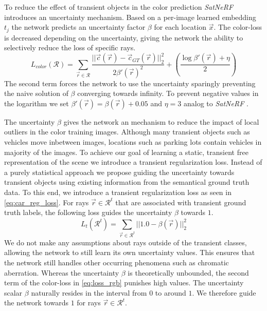 To reduce the effect of transient objects in the color prediction \textit{SatNeRF} \cite{satnerf} introduces an uncertainty mechanism. Based on a per-image learned embedding $t_j$ the network predicts an uncertainty factor $\beta$ for each location $\vec{x}$.
The color-loss is decreased depending on the uncertainty, giving the network the ability to selectively reduce the loss of specific rays. 
\begin{equation}
	L_{color}(\mathcal{R}) = \sum_{\vec{r} \in \mathcal{R}} \frac{|| \vec{c}(\vec{r}) - \vec{c}_{GT}(\vec{r}) ||^2_2}{2\beta'(\vec{r})^2} + \left( \frac{\log{\beta'(\vec{r}) + \eta}}{2} \right)
	\label{eq:loss_rgb}
\end{equation}
The second term forces the network to use the uncertainty sparingly preventing the naive solution of $\beta$ converging towards infinity. To prevent negative values in the logarithm we set $\beta'(\vec{r}) = \beta(\vec{r}) + 0.05$ and $\eta = 3$ analog to \emph{SatNeRF} \cite{satnerf}.


The uncertainty $\beta$ gives the network an mechanism to reduce the impact of local outliers in the color training images. Although many transient objects such as vehicles move inbetween images, locations such as parking lots contain vehicles in majority of the images. To achieve our goal of learning a static, transient free representation of the scene we introduce a transient regularization loss. Instead of a purely statistical approach we propose guiding the uncertainty towards transient objects using existing information from the semantical ground truth data.
To this end, we introduce a transient regularization loss as seen in \cref{eq:car_reg_loss}. For rays $\vec{r} \in \mathcal{R}^t$ that are associated with transient ground truth labels, the following loss guides the uncertainty $\beta$ towards $1$. 
\begin{equation}
		L_{t}(\mathcal{R}^t) = \sum_{\vec{r} \in \mathcal{R}^t} || 1.0 - \beta(\vec{r})  ||^2_2 
		\label{eq:car_reg_loss}
\end{equation}
We do not make any assumptions about rays outside of the transient classes, allowing the network to still learn its own uncertainty values. This ensures that the network still handles other occurring phenomena such as chromatic aberration. 
Whereas the uncertainty $\beta$ is theoretically unbounded, the second term of the color-loss in \cref{eq:loss_rgb} punishes high values. The uncertainty scalar $\beta$ naturally resides in the interval from $0$ to around $1$. We therefore guide the network towards $1$ for rays $\vec{r} \in \mathcal{R}^{t}$.

